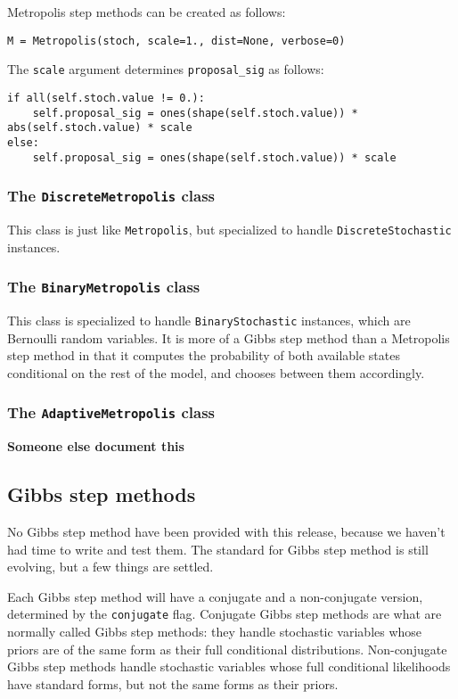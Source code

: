 Metropolis step methods can be created as follows:
\begin{verbatim}
M = Metropolis(stoch, scale=1., dist=None, verbose=0)
\end{verbatim}
The \texttt{scale} argument determines \texttt{proposal\_sig} as follows:
\begin{verbatim}
if all(self.stoch.value != 0.):
    self.proposal_sig = ones(shape(self.stoch.value)) * abs(self.stoch.value) * scale
else:
    self.proposal_sig = ones(shape(self.stoch.value)) * scale
\end{verbatim}

\subsubsection{The \texttt{DiscreteMetropolis} class}
This class is just like \texttt{Metropolis}, but specialized to handle \texttt{DiscreteStochastic} instances.

\subsubsection{The \texttt{BinaryMetropolis} class} 
This class is specialized to handle \texttt{BinaryStochastic} instances, which are Bernoulli random variables. It is more of a Gibbs step method than a Metropolis step method in that it computes the probability of both available states conditional on the rest of the model, and chooses between them accordingly.

\subsubsection{The \texttt{AdaptiveMetropolis} class} 
\textbf{Someone else document this}

\subsection{Gibbs step methods}
No Gibbs step method have been provided with this release, because we haven't had time to write and test them. The standard for Gibbs step method is still evolving, but a few things are settled.

Each Gibbs step method will have a conjugate and a non-conjugate version, determined by the \texttt{conjugate} flag. Conjugate Gibbs step methods are what are normally called Gibbs step methods: they handle stochastic variables whose priors are of the same form as their full conditional distributions. Non-conjugate Gibbs step methods handle stochastic variables whose full conditional likelihoods have standard forms, but not the same forms as their priors. 

